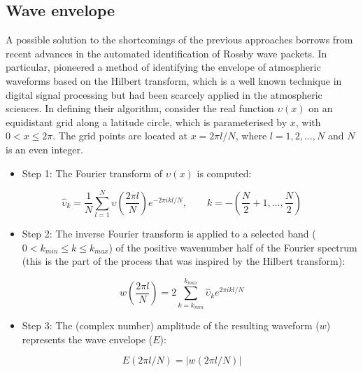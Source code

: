 \subsection{Wave envelope}

A possible solution to the shortcomings of the previous approaches borrows from recent advances in the automated identification of Rossby wave packets. In particular, \citet{Zimin2003} pioneered a method of identifying the envelope of atmospheric waveforms based on the Hilbert transform, which is a well known technique in digital signal processing but had been scarcely applied in the atmospheric sciences. In defining their algorithm, \citet{Zimin2003} consider the real function $\upsilon(x)$ on an equidistant grid along a latitude circle, which is parameterised by $x$, with $0 < x \leq 2\pi$. The grid points are located at $x = 2 \pi l / N$, where $l = 1, 2, \dotsc, N$ and $N$ is an even integer.
\begin{itemize}
\item Step 1: The Fourier transform of $\upsilon(x)$ is computed:
\end{itemize}

\begin{equation}\label{eq:fourier_transform}
\hat{\upsilon}_k = \frac{1}{N}\sum_{l=1}^N \upsilon \left( \frac{2 \pi l}{N} \right) e^{-2 \pi ikl/N},\qquad k = -\left( \frac{N}{2} + 1, \dotsc, \frac{N}{2} \right)
\end{equation}

\begin{itemize}
\item Step 2: The inverse Fourier transform is applied to a selected band ($0 < k_{min} \leq k \leq k_{max}$) of the positive wavenumber half of the Fourier spectrum (this is the part of the process that was inspired by the Hilbert transform):
\end{itemize}

\begin{equation}\label{eq:inverse_transform}
w \left( \frac{2 \pi l}{N} \right) = 2 \sum_{k=k_{min}}^{k_{max}} \hat{\upsilon}_k e^{2\pi ikl/N}
\end{equation}

\begin{itemize}
\item Step 3: The (complex number) amplitude of the resulting waveform ($w$) represents the wave envelope ($E$):
\end{itemize}

\begin{equation}\label{eq:wave_envelope}
E(2 \pi l / N) = | w(2 \pi l / N) |
\end{equation}

